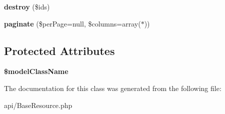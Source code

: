 \begin{DoxyCompactItemize}
\item 
\hypertarget{classDMA_1_1Friends_1_1Api_1_1GenericModelRepository_a82078490bec0c283af63fb52200224a0}{}{\bfseries destroy} (\$ids)\label{classDMA_1_1Friends_1_1Api_1_1GenericModelRepository_a82078490bec0c283af63fb52200224a0}

\item 
\hypertarget{classDMA_1_1Friends_1_1Api_1_1GenericModelRepository_a2d7794ceb5795fef531ad856b36d0daa}{}{\bfseries paginate} (\$per\+Page=null, \$columns=array(\textquotesingle{}$\ast$\textquotesingle{}))\label{classDMA_1_1Friends_1_1Api_1_1GenericModelRepository_a2d7794ceb5795fef531ad856b36d0daa}

\end{DoxyCompactItemize}
\subsection*{Protected Attributes}
\begin{DoxyCompactItemize}
\item 
\hypertarget{classDMA_1_1Friends_1_1Api_1_1GenericModelRepository_a24215ef1696b0dedaf385b16f03ea000}{}{\bfseries \$model\+Class\+Name}\label{classDMA_1_1Friends_1_1Api_1_1GenericModelRepository_a24215ef1696b0dedaf385b16f03ea000}

\end{DoxyCompactItemize}


The documentation for this class was generated from the following file\+:\begin{DoxyCompactItemize}
\item 
api/Base\+Resource.\+php\end{DoxyCompactItemize}
